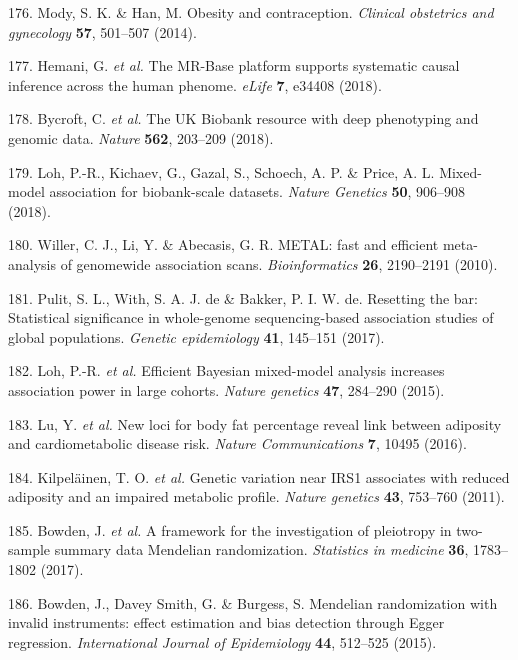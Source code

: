 \documentclass[11pt,twoside]{bristolthesis}
\begin{document}
\leavevmode\hypertarget{ref-Mody2014}{}%
176. Mody, S. K. \& Han, M. Obesity and contraception. \emph{Clinical obstetrics and gynecology} \textbf{57}, 501--507 (2014).

\leavevmode\hypertarget{ref-Hemani2018}{}%
177. Hemani, G. \emph{et al.} The MR-Base platform supports systematic causal inference across the human phenome. \emph{eLife} \textbf{7}, e34408 (2018).

\leavevmode\hypertarget{ref-Bycroft2018}{}%
178. Bycroft, C. \emph{et al.} The UK Biobank resource with deep phenotyping and genomic data. \emph{Nature} \textbf{562}, 203--209 (2018).

\leavevmode\hypertarget{ref-Loh2018}{}%
179. Loh, P.-R., Kichaev, G., Gazal, S., Schoech, A. P. \& Price, A. L. Mixed-model association for biobank-scale datasets. \emph{Nature Genetics} \textbf{50}, 906--908 (2018).

\leavevmode\hypertarget{ref-Willer2010a}{}%
180. Willer, C. J., Li, Y. \& Abecasis, G. R. METAL: fast and efficient meta-analysis of genomewide association scans. \emph{Bioinformatics} \textbf{26}, 2190--2191 (2010).

\leavevmode\hypertarget{ref-Pulit2017a}{}%
181. Pulit, S. L., With, S. A. J. de \& Bakker, P. I. W. de. Resetting the bar: Statistical significance in whole-genome sequencing-based association studies of global populations. \emph{Genetic epidemiology} \textbf{41}, 145--151 (2017).

\leavevmode\hypertarget{ref-Loh2015}{}%
182. Loh, P.-R. \emph{et al.} Efficient Bayesian mixed-model analysis increases association power in large cohorts. \emph{Nature genetics} \textbf{47}, 284--290 (2015).

\leavevmode\hypertarget{ref-Lu2016}{}%
183. Lu, Y. \emph{et al.} New loci for body fat percentage reveal link between adiposity and cardiometabolic disease risk. \emph{Nature Communications} \textbf{7}, 10495 (2016).

\leavevmode\hypertarget{ref-Kilpelainen2011b}{}%
184. Kilpeläinen, T. O. \emph{et al.} Genetic variation near IRS1 associates with reduced adiposity and an impaired metabolic profile. \emph{Nature genetics} \textbf{43}, 753--760 (2011).

\leavevmode\hypertarget{ref-Bowden2017}{}%
185. Bowden, J. \emph{et al.} A framework for the investigation of pleiotropy in two-sample summary data Mendelian randomization. \emph{Statistics in medicine} \textbf{36}, 1783--1802 (2017).

\leavevmode\hypertarget{ref-Bowden2015a}{}%
186. Bowden, J., Davey Smith, G. \& Burgess, S. Mendelian randomization with invalid instruments: effect estimation and bias detection through Egger regression. \emph{International Journal of Epidemiology} \textbf{44}, 512--525 (2015).
\end{document}
